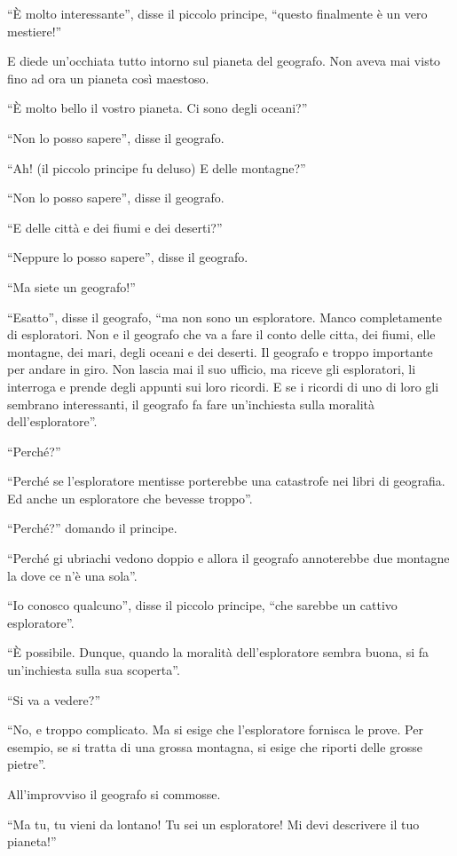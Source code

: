 \documentclass[11pt]{scrbook}
\begin{document}
``È molto interessante'', disse il piccolo principe, ``questo finalmente è un vero mestiere!''

E diede un'occhiata tutto intorno sul pianeta del geografo. Non aveva mai visto fino ad ora un pianeta così maestoso.

``È molto bello il vostro pianeta. Ci sono degli oceani?''

``Non lo posso sapere'', disse il geografo.

``Ah! (il piccolo principe fu deluso) E delle montagne?''

``Non lo posso sapere'', disse il geografo.

``E delle città e dei fiumi e dei deserti?''

``Neppure lo posso sapere'', disse il geografo.

``Ma siete un geografo!''

``Esatto'', disse il geografo, ``ma non sono un esploratore. Manco completamente di esploratori. Non e il geografo che va a fare il conto delle citta, dei fiumi, elle montagne, dei mari, degli oceani e dei deserti. Il geografo e troppo importante per andare in giro. Non lascia mai il suo ufficio, ma riceve gli esploratori, li interroga e prende degli appunti sui loro ricordi. E se i ricordi di uno di loro gli sembrano interessanti, il geografo fa fare un'inchiesta sulla moralità dell'esploratore''.

``Perché?''

``Perché se l'esploratore mentisse porterebbe una catastrofe nei libri di geografia. Ed anche un esploratore che bevesse troppo''.

``Perché?'' domando il principe.

``Perché gi ubriachi vedono doppio e allora il geografo annoterebbe due montagne la dove ce n'è una sola''.

``Io conosco qualcuno'', disse il piccolo principe, ``che sarebbe un cattivo esploratore''.

``È possibile. Dunque, quando la moralità dell'esploratore sembra buona, si fa un'inchiesta sulla sua scoperta''.

``Si va a vedere?''

``No, e troppo complicato. Ma si esige che l'esploratore fornisca le prove. Per esempio, se si tratta di una grossa montagna, si esige che riporti delle grosse pietre''.

All'improvviso il geografo si commosse.

``Ma tu, tu vieni da lontano! Tu sei un esploratore! Mi devi descrivere il tuo pianeta!''
\end{document}
